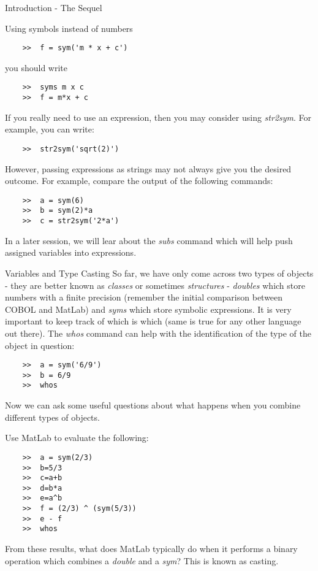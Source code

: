 \documentclass[11pt, oneside]{report}   	%
\begin{document}
\begin{chapter}{Introduction - The Sequel}
\begin{section}{Using symbols instead of numbers}
\begin{lstlisting}
	>>	f = sym('m * x + c')
\end{lstlisting}
you should write 
\begin{lstlisting}
	>>	syms m x c
	>>	f = m*x + c
\end{lstlisting}

If you really need to use an expression, then you may consider using \textit{str2sym}. For example, you can write:
\begin{lstlisting}
	>>	str2sym('sqrt(2)')
\end{lstlisting}
However, passing expressions as strings may not always give you the desired outcome. For example, compare the
output of the following commands:
\begin{lstlisting}
	>>	a = sym(6)
	>>	b = sym(2)*a
	>>	c = str2sym('2*a')
\end{lstlisting}
In a later session, we will lear about the \textit{subs} command which will help push assigned variables into
expressions.

\end{section}

\begin{section}{Variables and Type Casting}
So far, we have only come across two types of objects - they are better known as \textit{classes} or sometimes
\textit{structures} - \textit{doubles} which store numbers with a finite precision (remember the initial comparison
between COBOL and MatLab) and \textit{syms} which store symbolic expressions. It is very important to keep track
of which is which (same is true for any other language out there). The \textit{whos} command can help with the
identification of the type of the object in question:

\begin{lstlisting}
	>>	a = sym('6/9')
	>>	b = 6/9
	>>	whos
\end{lstlisting}

Now we can ask some useful questions about what happens when you combine different types of objects.

\begin{Exercise}
Use MatLab to evaluate the following:

\begin{lstlisting}
	>>	a = sym(2/3)
	>>	b=5/3
	>>	c=a+b
	>>	d=b*a
	>>	e=a^b
	>>	f = (2/3) ^ (sym(5/3))
	>>	e - f
	>>	whos
\end{lstlisting}
From these results, what does MatLab typically do when it performs a binary operation which combines a
\textit{double} and a \textit{sym}? This is known as casting.
\end{Exercise}


\end{section}
\end{chapter}
\end{document}
